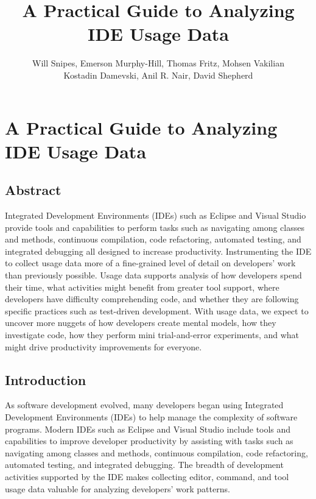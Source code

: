 \documentclass{book}
\begin{document}

\title{A Practical Guide to Analyzing IDE Usage Data\vspace{-0ex}}

\chapter{A Practical Guide to Analyzing IDE Usage Data\vspace{-0ex}}
\author{
Will Snipes, Emerson Murphy-Hill,
Thomas Fritz, Mohsen Vakilian \\
Kostadin Damevski,
Anil R. Nair, David Shepherd
}
\maketitle
\thispagestyle{empty}
\pagestyle{empty}

\begin{center}
\section*{Abstract}
\end{center}
Integrated Development Environments (IDEs) such as Eclipse and Visual Studio provide tools and capabilities to perform tasks such as navigating among classes and methods, continuous compilation, code refactoring, automated testing, and integrated debugging all designed to increase productivity.  Instrumenting the IDE to collect usage data more of a fine-grained level of detail on developers' work than previously possible.  Usage data supports analysis of how developers spend their time, what activities might benefit from greater tool support, where developers have difficulty comprehending code, and whether they are following specific practices such as test-driven development.  With usage data, we expect to uncover more nuggets of how developers create mental models, how they investigate code, how they perform mini trial-and-error experiments, and what might drive productivity improvements for everyone.

\section{Introduction}
As software development evolved, many developers began using Integrated Development Environments (IDEs) to help manage the complexity of software programs.  Modern IDEs such as Eclipse and Visual Studio include tools and capabilities to improve developer productivity by assisting with tasks such as navigating among classes and methods, continuous compilation, code refactoring, automated testing, and integrated debugging.  The breadth of development activities supported by the IDE makes collecting editor, command, and tool usage data valuable for analyzing developers' work patterns.  
\end{document}
